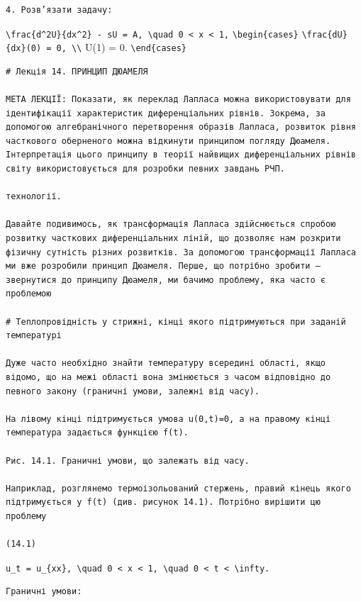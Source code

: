 \documentclass[
  ukrainian,
]{article}
\begin{document}
\begin{verbatim}
4. Розв’язати задачу:
\end{verbatim}

\texttt{\textbackslash{}frac\{d\^{}2U\}\{dx\^{}2\}\ -\ sU\ =\ A,\ \textbackslash{}quad\ 0\ \textless{}\ x\ \textless{}\ 1,}
\texttt{\textbackslash{}begin\{cases\}}
\texttt{\textbackslash{}frac\{dU\}\{dx\}(0)\ =\ 0,\ \textbackslash{}\textbackslash{}}
U(1) = 0. \texttt{\textbackslash{}end\{cases\}}

\begin{verbatim}
# Лекція 14. ПРИНЦИП ДЮАМЕЛЯ

МЕТА ЛЕКЦІЇ: Показати, як переклад Лапласа можна використовувати для ідентифікації характеристик диференціальних рівнів. Зокрема, за допомогою алгебранічного перетворення образів Лапласа, розвиток рівня часткового оберненого можна відкинути принципом погляду Дюамеля. Інтерпретація цього принципу в теорії найвищих диференціальних рівнів світу використовується для розробки певних завдань РЧП.

технології.

Давайте подивимось, як трансформація Лапласа здійснюється спробою розвитку часткових диференціальних ліній, що дозволяє нам розкрити фізичну сутність різних розвитків. За допомогою трансформації Лапласа ми вже розробили принцип Дюамеля. Перше, що потрібно зробити — звернутися до принципу Дюамеля, ми бачимо проблему, яка часто є проблемою

# Теплопровідність у стрижні, кінці якого підтримуються при заданій температурі

Дуже часто необхідно знайти температуру всередині області, якщо відомо, що на межі області вона змінюється з часом відповідно до певного закону (граничні умови, залежні від часу).

На лівому кінці підтримується умова u(0,t)=0, а на правому кінці температура задається функцією f(t).

Рис. 14.1. Граничні умови, що залежать від часу.

Наприклад, розглянемо термоізольований стержень, правий кінець якого підтримується у f(t) (див. рисунок 14.1). Потрібно вирішити цю проблему

(14.1)
\end{verbatim}

\texttt{u\_t\ =\ u\_\{xx\},\ \textbackslash{}quad\ 0\ \textless{}\ x\ \textless{}\ 1,\ \textbackslash{}quad\ 0\ \textless{}\ t\ \textless{}\ \textbackslash{}infty.}

\begin{verbatim}
Граничні умови:
\end{verbatim}
\end{document}

